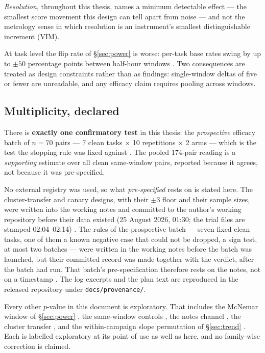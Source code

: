 \emph{Resolution}, throughout this thesis, names a minimum detectable
effect --- the smallest score movement this design can tell apart from
noise --- and not the metrology sense in which resolution is an
instrument's smallest distinguishable increment (VIM).

At task level the flip rate of \S\ref{sec:power} is worse: per-task base
rates swing by up to $\pm 50$ percentage points between half-hour windows
. Two consequences are treated as design constraints rather than as
findings: single-window deltas of five or fewer are unreadable, and any efficacy
claim requires pooling across windows.

\subsection*{Multiplicity, declared}

There is \textbf{exactly one confirmatory test} in this thesis: the
\emph{prospective} efficacy batch of $n{=}70$ pairs --- 7 clean tasks
$\times$ 10 repetitions $\times$ 2 arms --- which is the test the stopping
rule was fixed against . The pooled 174-pair reading is a
\emph{supporting} estimate over all clean same-window pairs, reported
because it agrees, not because it was pre-specified.

No external registry was used, so what \emph{pre-specified} rests on is
stated here. The cluster-transfer and canary designs, with their
$\pm 3$ floor and their sample sizes, were written into the working notes
and committed to the author's working repository before their data
existed (25 August 2026, 01:30; the trial files are stamped 02:04--02:14)
. The rules of the prospective batch --- seven fixed clean
tasks, one of them a known negative case that could not be dropped, a
sign test, at most two batches --- were written in the working notes
before the batch was launched, but their committed record was made
together with the verdict, after the batch had run. That batch's
pre-specification therefore rests on the notes, not on a timestamp
. The log excerpts and the plan text are reproduced in the released
repository under \texttt{docs/provenance/}.

Every other $p$-value in this document is exploratory. That includes the
McNemar window of \S\ref{sec:power} , the same-window controls
, the notes channel , the cluster transfer , and the
within-campaign slope permutation of \S\ref{sec:trend} . Each is
labelled exploratory at its point of use as well as here, and no
family-wise correction is claimed.

